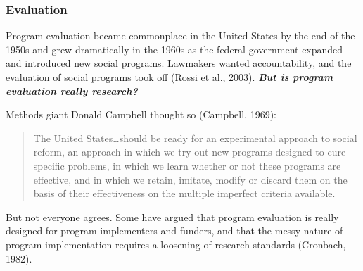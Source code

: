 \documentclass[
  letterpaper,
  DIV=11,
  numbers=noendperiod,
  oneside]{scrreprt}
\begin{document}
\hypertarget{evaluation}{%
\subsubsection*{Evaluation}\label{evaluation}}

Program evaluation became commonplace in the United States by the end of
the 1950s and grew dramatically in the 1960s as the federal government
expanded and introduced new social programs. Lawmakers wanted
accountability, and the evaluation of social programs took off (Rossi et
al.,
2003).
\textbf{\emph{But is program evaluation really research?}}

Methods giant Donald Campbell thought so (Campbell,
1969):

\begin{quote}
The United States\ldots should be ready for an experimental approach to
social reform, an approach in which we try out new programs designed to
cure specific problems, in which we learn whether or not these programs
are effective, and in which we retain, imitate, modify or discard them
on the basis of their effectiveness on the multiple imperfect criteria
available.
\end{quote}

But not everyone agrees. Some have argued that program evaluation is
really designed for program implementers and funders, and that the messy
nature of program implementation requires a loosening of research
standards (Cronbach,
1982).
\end{document}
